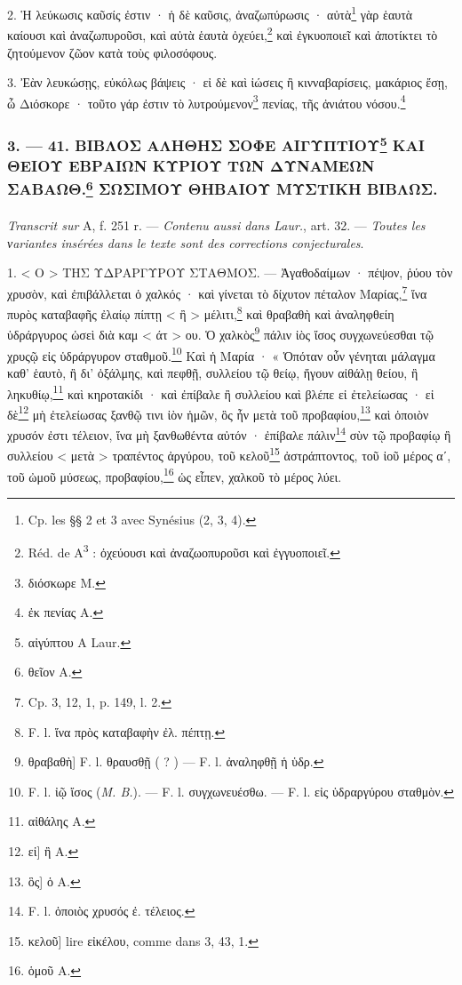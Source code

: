 \documentclass[landscape, a4paper, 11pt, oneside, polutonikogreek, french]{article}
\begin{document}
2. Ἡ λεύκωσις καῦσίς ἐστιν · ἡ δὲ καῦσις, ἀναζωπύρωσις · αὐτὰ\footnote{Cp. les §§ 2 et 3 avec Synésius (2, 3, 4).} γὰρ ἑαυτὰ καίουσι καὶ ἀναζωπυροῦσι, καὶ αὐτὰ ἑαυτὰ ὀχεύει,\footnote{Réd. de A\textsuperscript{3} : ὀχεύουσι καὶ ἀναζωοπυροῦσι καὶ ἐγγυοποιεῖ.} καὶ ἐγκυοποιεῖ καὶ ἀποτίκτει τὸ ζητούμενον ζῶον κατὰ τοὺς φιλοσόφους.

3. Ἐὰν λευκώσῃς, εὐκόλως βάψεις · εἰ δὲ καὶ ἰώσεις ἢ κινναβαρίσεις, μακάριος ἔσῃ, ὦ Διόσκορε · τοῦτο γάρ ἐστιν τὸ λυτρούμενον\footnote{διόσκωρε M.} πενίας, τῆς ἀνιάτου νόσου.\footnote{ἐκ πενίας A.}

\bigskip
\centerline{\EightStarTaper}
\centerline{\EightStarTaper\EightStarTaper}
\bigskip

\subsubsection[3. --- 41. ΒΙΒΛΟΣ ΑΛΗΘΗΣ ΣΟΦΕ ΑΙΓΥΠΤΙΟΥ ΚΑΙ ΘΕΙΟΥ ΕΒΡΑΙΩΝ ΚΥΡΙΟΥ ΤΩΝ ΔΥΝΑΜΕΩΝ ΣΑΒΑΩΘ. ΣΩΣΙΜΟΥ ΘΗΒΑΙΟΥ ΜΥΣΤΙΚΗ ΒΙΒΛΩΣ.]{3. --- 41. ΒΙΒΛΟΣ ΑΛΗΘΗΣ ΣΟΦΕ ΑΙΓΥΠΤΙΟΥ\footnote{αἰγύπτου A Laur.} ΚΑΙ ΘΕΙΟΥ ΕΒΡΑΙΩΝ ΚΥΡΙΟΥ ΤΩΝ ΔΥΝΑΜΕΩΝ ΣΑΒΑΩΘ.\footnote{θεῖον A.} ΣΩΣΙΜΟΥ ΘΗΒΑΙΟΥ ΜΥΣΤΙΚΗ ΒΙΒΛΩΣ.}
\paragraph{}
\emph{Transcrit sur} A, f. 251 r. --- \emph{Contenu aussi dans Laur.}, art. 32. --- \emph{Toutes les νariantes insérées dans le texte sont des corrections conjecturales}.

\bigskip

1. < Ο > ΤΗΣ ΥΔΡΑΡΓΥΡΟΥ ΣΤΑΘΜΟΣ. --- Ἀγαθοδαίμων · πέψον, ῥύου τὸν χρυσὸν, καὶ ἐπιβάλλεται ὁ χαλκός · καὶ γίνεται τὸ δίχυτον πέταλον Μαρίας,\footnote{Cp. 3, 12, 1, p. 149, l. 2.} ἵνα πυρὸς καταβαφῆς ἐλαίῳ πίπτῃ < ἢ > μέλιτι,\footnote{F. l. ἵνα πρὸς καταβαφὴν ἐλ. πέπτῃ.} καὶ θραβαθὴ καὶ ἀναληφθείη ὑδράργυρος ὡσεὶ διὰ καμ < άτ > ου. Ὁ χαλκὸς\footnote{θραβαθὴ] F. l. θραυσθῇ ( ? ) --- F. l. ἀναληφθῇ ἡ ὑδρ.} πάλιν ἰὸς ἴσος συγχωνεύεσθαι τῷ χρυςῷ εἰς ὑδράργυρον σταθμοῦ.\footnote{F. l. ἰῷ ἴσος (\emph{M. B.}). --- F. l. συγχωνευέσθω. --- F. l. εἰς ὑδραργύρου σταθμὸν.} Καὶ ἡ Μαρία · « Ὁπόταν οὖν γένηται μάλαγμα καθ' ἑαυτὸ, ἢ δι' ὀξάλμης, καὶ πεφθῇ, συλλείου τῷ θείῳ, ἤγουν αἰθάλῃ θείου, ἢ ληκυθίῳ,\footnote{αἰθάλης A.} καὶ κηροτακίδι · καὶ ἐπίβαλε ἢ συλλείου καὶ βλέπε εἰ ἐτελείωσας · εἰ δὲ\footnote{εἰ] ἢ A.} μὴ ἐτελείωσας ξανθῷ τινι ἰὸν ἡμῶν, ὃς ἦν μετὰ τοῦ προβαφίου,\footnote{ὃς] ὁ A.} καὶ ὁποιὸν χρυσόν ἐστι τέλειον, ἵνα μὴ ξανθωθέντα αὐτόν · ἐπίβαλε πάλιν\footnote{F. l. ὁποιὸς χρυσός ἐ. τέλειος.} σὺν τῷ προβαφίῳ ἢ συλλείου < μετὰ > τραπέντος ἀργύρου, τοῦ κελοῦ\footnote{κελοῦ] lire εἰκέλου, comme dans 3, 43, 1.} ἀστράπτοντος, τοῦ ἰοῦ μέρος αʹ, τοῦ ὠμοῦ μύσεως, προβαφίου,\footnote{ὁμοῦ A.} ὡς εἶπεν, χαλκοῦ τὸ μέρος λύει.
\end{document}
